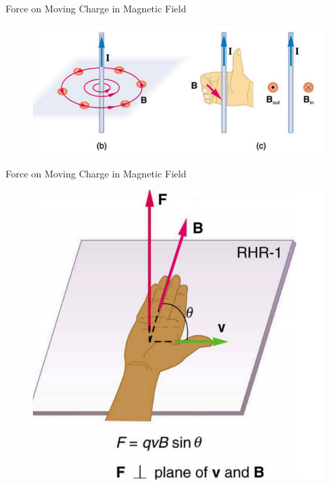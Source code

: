 \documentclass{beamer}
\begin{document}
\begin{frame}{Force on Moving Charge in Magnetic Field}
    \begin{figure}
        \centering
        \includegraphics[width=0.75\linewidth]{mgRHR.png}
    \end{figure}
\end{frame}
\begin{frame}{Force on Moving Charge in Magnetic Field}
    
\begin{figure}
    \centering
    \includegraphics[width=1\linewidth]{rhr1-.png}
\end{figure}
\end{frame}
\end{document}
